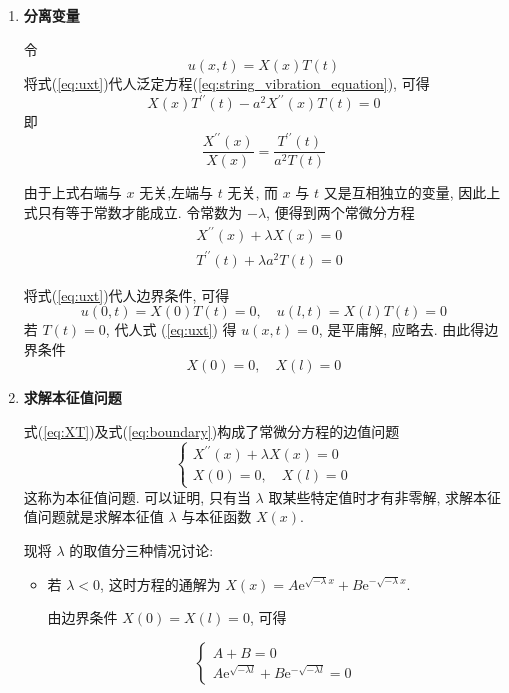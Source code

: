 \begin{enumerate}
  \item \textbf{分离变量}

    令
    \begin{equation}
        u(x, t)=X(x) T(t)
        \label{eq:uxt}
    \end{equation}
    将式(\ref{eq:uxt})代人泛定方程(\ref{eq:string_vibration_equation}), 可得
    $$
    X(x) T^{\prime \prime}(t)-a^{2} X^{\prime \prime}(x) T(t)=0
    $$
即
$$
\frac{X^{\prime \prime}(x)}{X(x)}=\frac{T^{\prime \prime}(t)}{a^{2} T(t)}
$$

由于上式右端与 $x$ 无关,左端与 $t$ 无关, 而 $x$ 与 $t$ 又是互相独立的变量, 
因此上式只有等于常数才能成立. 令常数为 $-\lambda$, 便得到两个常微分方程
\begin{equation}
    \begin{aligned}
        & X^{\prime \prime}(x)+\lambda X(x)=0 \\
        & T^{\prime \prime}(t)+\lambda a^{2} T(t)=0
        \end{aligned}
        \label{eq:XT}
\end{equation}

将式(\ref{eq:uxt})代人边界条件, 可得
$$
u(0, t)=X(0) T(t)=0, \quad u(l, t)=X(l) T(t)=0
$$
若 $T(t)=0$, 代人式 (\ref{eq:uxt}) 得 $u(x, t)=0$, 是平庸解, 应略去. 由此得边界条件
\begin{equation}
    X(0)=0, \quad X(l)=0
    \label{eq:boundary}
\end{equation}

\item \textbf{求解本征值问题}

式(\ref{eq:XT})及式(\ref{eq:boundary})构成了常微分方程的边值问题
$$
\left\{\begin{array}{l}
X^{\prime \prime}(x)+\lambda X(x)=0 \\
X(0)=0, \quad X(l)=0
\end{array}\right.
$$
这称为本征值问题. 
可以证明, 只有当 $\lambda$ 取某些特定值时才有非零解,
求解本征值问题就是求解本征值 $\lambda$ 与本征函数 $X(x)$.

现将 $\lambda$ 的取值分三种情况讨论:

\begin{itemize}
    \item 若 $\lambda<0$, 这时方程的通解为 $X(x)=A \mathrm{e}^{\sqrt{-\lambda} x}+B \mathrm{e}^{-\sqrt{-\lambda} x}$.

        由边界条件 $X(0)=X(l)=0$, 可得
        
        $$
        \left\{\begin{array}{l}
        A+B=0 \\
        A \mathrm{e}^{\sqrt{-\lambda l}}+B \mathrm{e}^{-\sqrt{-\lambda l}}=0
        \end{array}\right.
        $$
        

\end{itemize}
\end{enumerate}
